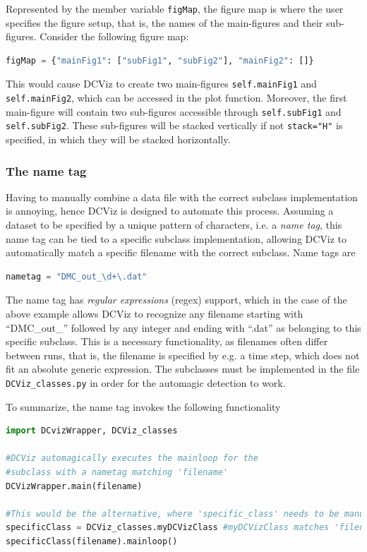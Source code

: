 Represented by the member variable \verb+figMap+, the figure map is where the user specifies the figure setup, that is, the names of the main-figures and their sub-figures. Consider the following figure map:  

\begin{lstlisting}[language=Python]
figMap = {"mainFig1": ["subFig1", "subFig2"], "mainFig2": []} 
\end{lstlisting}

This would cause DCViz to create two main-figures \verb+self.mainFig1+ and \verb+self.mainFig2+, which can be accessed in the plot function. Moreover, the first main-figure will contain two sub-figures accessible through \verb+self.subFig1+ and \verb+self.subFig2+. These sub-figures will be stacked vertically if not \verb+stack="H"+ is specified, in which they will be stacked horizontally. 


\subsubsection{The name tag}

Having to manually combine a data file with the correct subclass implementation is annoying, hence DCViz is designed to automate this process. Assuming a dataset to be specified by a unique pattern of characters, i.e. a \textit{name tag}, this name tag can be tied to a specific subclass implementation, allowing DCViz to automatically match a specific filename with the correct subclass. Name tags are

\begin{lstlisting}[language=Python]
 nametag = "DMC_out_\d+\.dat"
\end{lstlisting}

The name tag has \textit{regular expressions} (regex) support, which in the case of the above example allows DCViz to recognize any filename starting with ``DMC\_out\_'' followed by any integer and ending with ``.dat'' as belonging to this specific subclass. This is a necessary functionality, as filenames often differ between runs, that is, the filename is specified by e.g. a time step, which does not fit an absolute generic expression. The subclasses must be implemented in the file \verb+DCViz_classes.py+ in order for the automagic detection to work.

To summarize, the name tag invokes the following functionality

\begin{lstlisting}[language=Python]
import DCvizWrapper, DCViz_classes

#DCViz automagically executes the mainloop for the 
#subclass with a nametag matching 'filename'
DCVizWrapper.main(filename) 

#This would be the alternative, where 'specific_class' needs to be manually selected.
specificClass = DCViz_classes.myDCVizClass #myDCVizClass matches 'filename'
specificClass(filename).mainloop()
\end{lstlisting}


